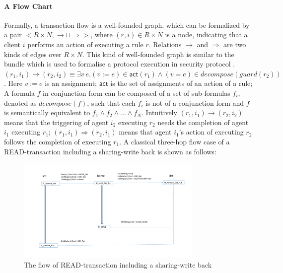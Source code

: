 \documentclass{llncs}
\begin{document}
\paragraph*{A Flow Chart}Formally, a transaction flow is a well-founded graph, which can be formalized by a pair $<R \times N, \rightarrow \cup \Rightarrow>$, where $(r,i) \in R \times N$ is a  node, indicating that a client $i$ performs an action of executing a rule $r$. Relations  $\rightarrow$  and $\Rightarrow$ are two kinds of edges over $R \times N$. This kind of well-founded graph is similar to the bundle which is used to formalise a protocol execution in security protocol \cite{}.   $(r_1,i_1) \rightarrow (r_2,i_2) \equiv \exists v~e. (v:=e) \in \mathsf{act}(r_1) \land (v=e) \in decompose(guard(r_2))$. Here $v:=e$ is an assignment; $\mathsf{act}$ is the set of assignments of an action of a rule; A formula $f$ in conjunction form can be composed of a set of sub-formulas $f_i$, denoted as $decompose(f)$, such that each $f_i$  is not of a conjunction form and $f$ is semantically equivalent to $f_1 \land f_2 \land ... \land f_N$. Intuitively $(r_1,i_1) \rightarrow (r_2,i_2)$ means that the triggering of agent $i_2$ executing $r_2$ needs the completion of agent $i_1$ executing $r_1$; $(r_1,i_1) \Rightarrow (r_2,i_1)$ means that agent $i_1$'s action of executing $r_2$ follows the completion of  executing $r_1$. A classical three-hop flow case of a READ-transaction including a sharing-write back is shown as follows:
 

\vspace{-20pt}
\begin{figure}[htbp]
\centering
\includegraphics[width=0.8\textwidth]{flow2.pdf}
\vspace{-20pt}
\caption{The flow of READ-transaction including a sharing-write back\label{fig:arch}}
\end{figure}
\vspace{-15pt}
\end{document}
